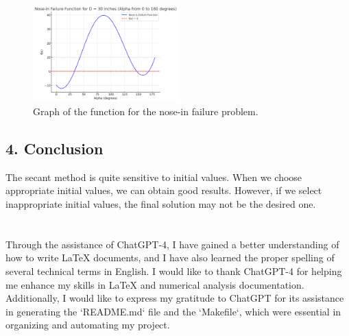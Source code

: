 \documentclass[a4paper]{article}
\begin{document}
\begin{figure}
  \centering
  \includegraphics[width=0.5\textwidth]{./figures/F.png}
  \caption{Graph of the function for the nose-in failure problem.}
  \label{fig:2}
\end{figure}
\subsection*{4. Conclusion}

The secant method is quite sensitive to initial values. When we choose appropriate initial values, we can obtain good results. However, if we select inappropriate initial values, the final solution may not be the desired one.



\section*{  }
Through the assistance of ChatGPT-4, I have gained a better understanding of how to write LaTeX documents, and I have also learned the proper spelling of several technical terms in English. I would like to thank ChatGPT-4 for helping me enhance my skills in LaTeX and numerical analysis documentation. Additionally, I would like to express my gratitude to ChatGPT for its assistance in generating the `README.md` file and the `Makefile`, which were essential in organizing and automating my project.
\end{document}
